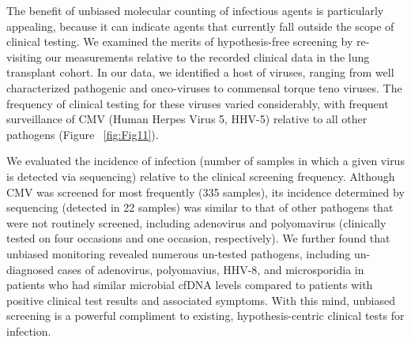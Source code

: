 The benefit of unbiased molecular counting of infectious agents is particularly appealing, because it can indicate agents that currently fall outside the scope of clinical testing. We examined the merits of hypothesis-free screening by re-visiting our measurements relative to the recorded clinical data in the lung transplant cohort. In our data, we identified a host of viruses, ranging from well characterized pathogenic and onco-viruses to commensal torque teno viruses. The frequency of clinical testing for these viruses varied considerably, with frequent surveillance of CMV (Human Herpes Virus 5, HHV-5) relative to all other pathogens (Figure ~\ref{fig:Fig11}). 

We evaluated the incidence of infection (number of samples in which a given virus is detected via sequencing) relative to the clinical screening frequency. Although CMV was screened for most frequently (335 samples), its incidence determined by sequencing (detected in 22 samples) was similar to that of other pathogens that were not routinely screened, including adenovirus and polyomavirus (clinically tested on four occasions and one occasion, respectively). We further found that unbiased monitoring revealed numerous un-tested pathogens, including un-diagnosed cases of adenovirus, polyomavius, HHV-8, and microsporidia in patients who had similar microbial cfDNA levels compared to patients with positive clinical test results and associated symptoms. With this mind, unbiased screening is a powerful compliment to existing, hypothesis-centric clinical tests for infection.

